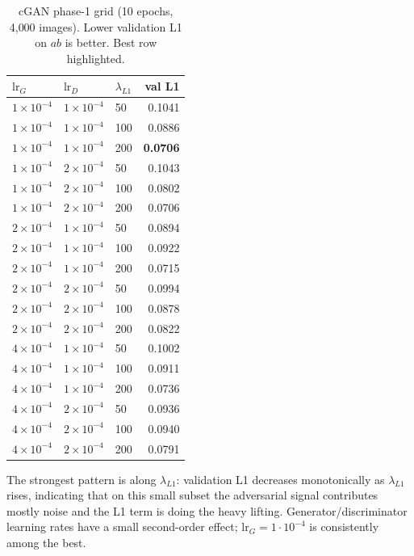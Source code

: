 \documentclass[conference]{IEEEtran}
\begin{document}
\begin{table}[!t]
\centering
\caption{cGAN phase-1 grid (10 epochs, 4{,}000 images). Lower
validation L1 on $ab$ is better. Best row highlighted.}
\label{tab:cgan_phase1}
\setlength\tabcolsep{4pt}
\begin{tabular}{lllr}
\toprule
$\mathrm{lr}_G$ & $\mathrm{lr}_D$ & $\lambda_{L1}$ & \textbf{val L1} \\
\midrule
$1{\times}10^{-4}$ & $1{\times}10^{-4}$ & 50  & 0.1041 \\
$1{\times}10^{-4}$ & $1{\times}10^{-4}$ & 100 & 0.0886 \\
\rowcolor{blue!8}
$1{\times}10^{-4}$ & $1{\times}10^{-4}$ & 200 & \textbf{0.0706} \\
$1{\times}10^{-4}$ & $2{\times}10^{-4}$ & 50  & 0.1043 \\
$1{\times}10^{-4}$ & $2{\times}10^{-4}$ & 100 & 0.0802 \\
$1{\times}10^{-4}$ & $2{\times}10^{-4}$ & 200 & 0.0706 \\
$2{\times}10^{-4}$ & $1{\times}10^{-4}$ & 50  & 0.0894 \\
$2{\times}10^{-4}$ & $1{\times}10^{-4}$ & 100 & 0.0922 \\
$2{\times}10^{-4}$ & $1{\times}10^{-4}$ & 200 & 0.0715 \\
$2{\times}10^{-4}$ & $2{\times}10^{-4}$ & 50  & 0.0994 \\
$2{\times}10^{-4}$ & $2{\times}10^{-4}$ & 100 & 0.0878 \\
$2{\times}10^{-4}$ & $2{\times}10^{-4}$ & 200 & 0.0822 \\
$4{\times}10^{-4}$ & $1{\times}10^{-4}$ & 50  & 0.1002 \\
$4{\times}10^{-4}$ & $1{\times}10^{-4}$ & 100 & 0.0911 \\
$4{\times}10^{-4}$ & $1{\times}10^{-4}$ & 200 & 0.0736 \\
$4{\times}10^{-4}$ & $2{\times}10^{-4}$ & 50  & 0.0936 \\
$4{\times}10^{-4}$ & $2{\times}10^{-4}$ & 100 & 0.0940 \\
$4{\times}10^{-4}$ & $2{\times}10^{-4}$ & 200 & 0.0791 \\
\bottomrule
\end{tabular}
\end{table}

The strongest pattern is along $\lambda_{L1}$: validation L1 decreases
monotonically as $\lambda_{L1}$ rises, indicating that on this small
subset the adversarial signal contributes mostly noise and the L1
term is doing the heavy lifting. Generator/discriminator learning
rates have a small second-order effect; $\mathrm{lr}_G\!=\!1\!\cdot\!10^{-4}$
is consistently among the best.
\end{document}
